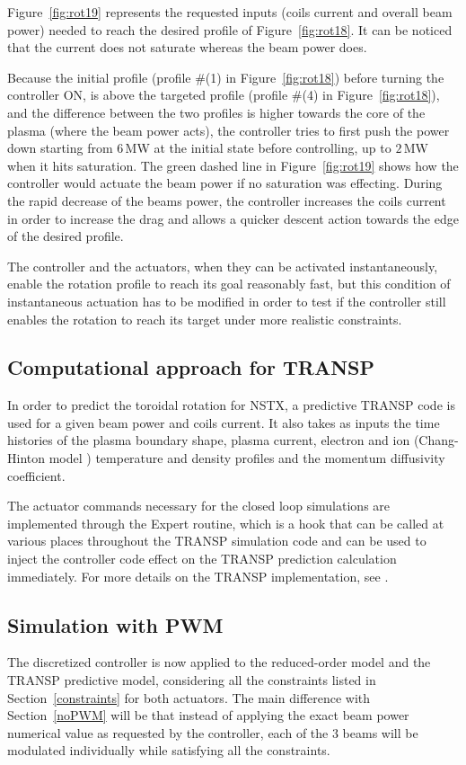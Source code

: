 \documentclass[12pt]{iopart}
\begin{document}
Figure~\ref{fig:rot19} represents the requested inputs (coils current and overall beam power) needed to reach the desired profile of Figure~\ref{fig:rot18}. It can be noticed that the current does not saturate whereas the beam power does.

Because the initial profile (profile \#(1) in Figure~\ref{fig:rot18}) before turning the controller ON, is above the targeted profile  (profile \#(4) in Figure~\ref{fig:rot18}), and the difference between the two profiles is higher towards the core of the plasma (where the beam power acts), the controller tries to first push the power down starting from $6$\,MW at the initial state before controlling, up to $2$\,MW when it hits saturation. The green dashed line in Figure~\ref{fig:rot19} shows how the controller would actuate the beam power if no saturation was effecting. During the rapid decrease of the beams power, the controller increases the coils current in order to increase the drag and allows a quicker descent action towards the edge of the desired profile.  

The controller and the actuators, when they can be activated instantaneously, enable the rotation profile to reach its goal reasonably fast, but this condition of instantaneous actuation has to be modified in order to test if the controller still enables the rotation to reach its target under more realistic constraints.

\subsection{Computational approach for TRANSP}
In order to predict the toroidal rotation for NSTX, a predictive TRANSP code is used for a given beam power and coils current. It also takes as inputs the time histories of the plasma boundary shape, plasma current, electron and ion (Chang-Hinton model \cite{Changhinton}) temperature and density profiles and the momentum diffusivity coefficient.

The actuator commands necessary for the closed loop simulations are implemented through the Expert routine, which is a hook that can be called at various places throughout the TRANSP simulation code and can be used to inject the controller code effect on the TRANSP prediction calculation immediately. For more details on the TRANSP implementation, see \cite{Boyer15}.

\subsection{Simulation with PWM}
The discretized controller is now applied to the reduced-order model and the TRANSP predictive model, considering all the constraints listed in Section~\ref{constraints} for both actuators. The main difference with Section~\ref{noPWM} will be that instead of applying the exact beam power numerical value as requested by the controller, each of the 3 beams will be modulated individually while satisfying all the constraints.
\end{document}
